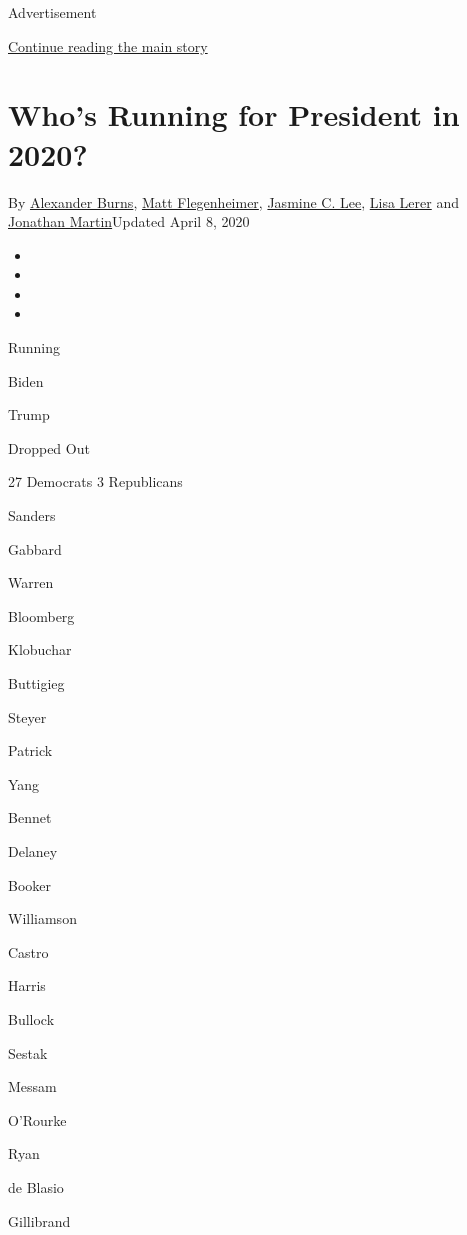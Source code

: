 Advertisement

\protect\hyperlink{after-top}{Continue reading the main story}

\hypertarget{whos-running-for-president-in-2020}{%
\section{Who's Running for President in
2020?}\label{whos-running-for-president-in-2020}}

By
\href{https://www.nytimes3xbfgragh.onion/by/alexander-burns}{Alexander
Burns},
\href{https://www.nytimes3xbfgragh.onion/by/matt-flegenheimer}{Matt
Flegenheimer},
\href{https://www.nytimes3xbfgragh.onion/by/jasmine-c-lee}{Jasmine C.
Lee}, \href{https://www.nytimes3xbfgragh.onion/by/lisa-lerer}{Lisa
Lerer} and
\href{https://www.nytimes3xbfgragh.onion/by/jonathan-martin}{Jonathan
Martin}Updated April 8, 2020

\begin{itemize}
\item
\item
\item
\item
\end{itemize}

Running

Biden

Trump

Dropped Out

27 Democrats 3 Republicans

Sanders

Gabbard

Warren

Bloomberg

Klobuchar

Buttigieg

Steyer

Patrick

Yang

Bennet

Delaney

Booker

Williamson

Castro

Harris

Bullock

Sestak

Messam

O'Rourke

Ryan

de Blasio

Gillibrand

